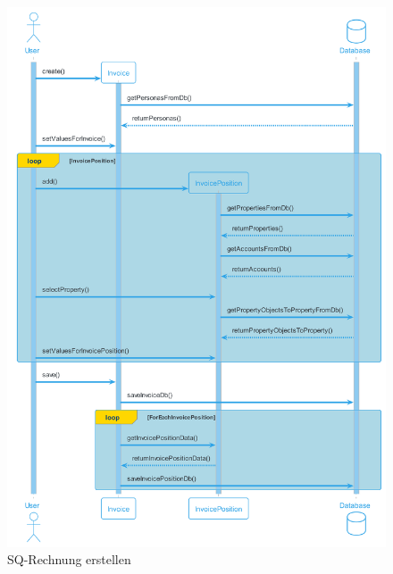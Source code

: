 \begin{figure}[H]
  \begin{center}
    \includegraphics[height=1\textheight]{content/diagrams/out/sequenzdiagram/rechnungErstellen/RechnungErstellen.png}
    \caption{SQ-Rechnung erstellen}
  \end{center}
\end{figure}

